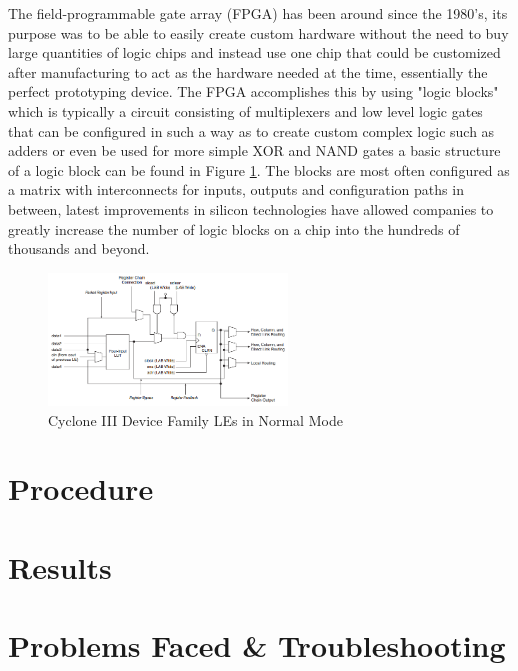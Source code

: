 \documentclass[conference]{IEEEtran}
\begin{document}
The field-programmable gate array (FPGA) has been around since the 1980's, its purpose was to be able to easily create custom hardware without the need to buy large quantities of logic chips and instead use one chip that could be customized after manufacturing to act as the hardware needed at the time, essentially the perfect prototyping device. The FPGA accomplishes this by using "logic blocks" which is typically a circuit consisting of multiplexers and low level logic gates that can be configured in such a way as to create custom complex logic such as adders or even be used for more simple XOR and NAND gates a basic structure of a logic block can be found in Figure \ref{fig_LogicElement}. The blocks are most often configured as a matrix with interconnects for inputs, outputs and configuration paths in between, latest improvements in silicon technologies have allowed companies to greatly increase the number of logic blocks on a chip into the hundreds of thousands and beyond.

\begin{figure}[!t]
\centering
\includegraphics[width=2.5in]{LogicElement}
\caption{Cyclone III Device Family LEs in Normal Mode \cite{CycloneHandbook}}
\label{fig_LogicElement}
\end{figure}

\section{}

\section{Procedure}

\section{Results}

\section{Problems Faced \& Troubleshooting}
\end{document}
